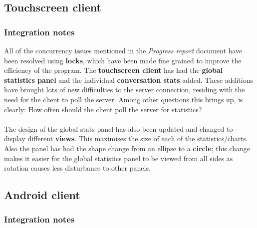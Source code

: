 \documentclass[12p, a4paper, onecolumn]{report}
\begin{document}
\subsection{Touchscreen client}

\subsubsection{Integration notes}

All of the concurrency issues mentioned in the \textit{Progress report} document have been resolved using \textbf{locks}, which have been made fine grained to improve the efficiency of the program. The \textbf{touchscreen client} has had the \textbf{global statistics panel} and the individual \textbf{conversation stats} added. These additions have brought lots of new difficulties to the server connection, residing with the need for the client to poll the server. Among other questions this brings up, is clearly: How often should the client poll the server for statistics? \\ \\
The design of the global stats panel has also been updated and changed to display different \textbf{views}. This maximises the size of each of the statistics/charts. Also the panel has had the shape change from an ellipse to a \textbf{circle}; this change makes it easier for the global statistics panel to be viewed from all sides as rotation causes less disturbance to other panels.

\subsection{Android client}

\subsubsection{Integration notes}
\end{document}
